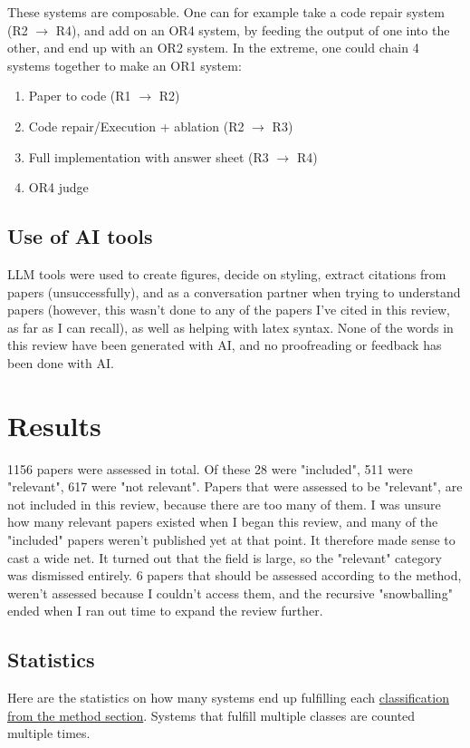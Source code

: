 \documentclass[8pt,a4paper]{article}
\begin{document}
These systems are composable. One can for example take a code repair system (R2 $\rightarrow$ R4), and add on an OR4 system, 
by feeding the output of one into the other, and end up with an OR2 system. In the extreme, one could chain 4 systems together to make an OR1 system:

\begin{enumerate}
    \item Paper to code (R1 $\rightarrow$ R2)
    \item Code repair/Execution + ablation (R2 $\rightarrow$ R3)
    \item Full implementation with answer sheet (R3 $\rightarrow$ R4)
    \item OR4 judge
\end{enumerate}

\subsection{Use of AI tools}
LLM tools were used to create figures, decide on styling, extract citations from papers (unsuccessfully), 
and as a conversation partner when trying to understand papers 
(however, this wasn't done to any of the papers I've cited in this review, as far as I can recall), 
as well as helping with latex syntax.
None of the words in this review have been generated with AI, and no proofreading or feedback has been done with AI.

\section{Results}
1156 papers were assessed in total. Of these 28 were "included", 511 were "relevant", 617 were "not relevant". 
Papers that were assessed to be "relevant", are not included in this review, because there are too many of them.
I was unsure how many relevant papers existed when I began this review, 
and many of the "included" papers weren't published yet at that point.
It therefore made sense to cast a wide net. It turned out that the field is large,
so the "relevant" category was dismissed entirely.
6 papers that should be assessed according to the method, weren't assessed because I couldn't access them, and
the recursive "snowballing" ended when I ran out time to expand the review further.

\subsection{Statistics}
Here are the statistics on how many systems end up fulfilling each \hyperref[itm:classification]{classification from the method section}. 
Systems that fulfill multiple classes are counted multiple times.
\end{document}
